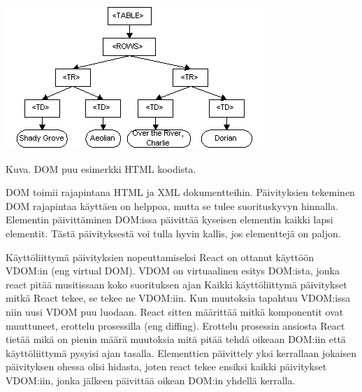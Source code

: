 \includegraphics{./src/public/oppar/dom.png}

Kuva\getImgCount .{} DOM puu esimerkki HTML koodista. 
\medskip



DOM toimii rajapintana HTML ja XML dokumentteihin.
Päivityksien tekeminen DOM rajapintaa käyttäen on helppoa, mutta se tulee suorituskyvyn hinnalla.
Elementin päivittäminen DOM:issa päivittää kyseisen elementin kaikki lapsi elementit. 
Tästä päivityksestä voi tulla hyvin kallis, jos elementtejä on paljon.

\bigskip




Käyttöliittymä päivityksien nopeuttamiseksi React on ottanut käyttöön VDOM:in (eng virtual DOM).
VDOM on virtuaalinen esitys DOM:ista, jonka react pitää musitissaan koko suorituksen ajan
Kaikki käyttöliittymä päivitykset mitkä React tekee, se tekee ne VDOM:iin.
Kun muutoksia tapahtuu VDOM:issa niin uusi VDOM puu luodaan. React sitten määrittää mitkä komponentit ovat muuttuneet, erottelu prosessilla (eng diffing).
Erottelu prosessin ansiosta React tietää mikä on pienin määrä muutoksia mitä pitää tehdä oikeaan DOM:iin että käyttöliittymä pysyisi ajan tasalla.
Elementtien päivittely yksi kerrallaan jokaisen päivityksen ohessa olisi hidasta,
joten react tekee ensiksi kaikki päivitykset VDOM:iin, jonka jälkeen päivittää oikean DOM:in yhdellä kerralla.\citemissing
\medskip



